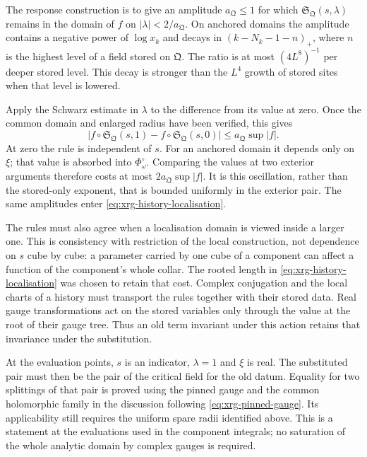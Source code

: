 \documentclass[11pt,letterpaper,reqno]{amsart}
\theoremstyle{definition}
\theoremstyle{remark}
\begin{document}
The response construction is to give an amplitude
$a_{\mathfrak Q}\le1$ for which
$\mathfrak S_{\mathfrak Q}(s,\lambda)$ remains in the domain of
$f$ on $|\lambda|<2/a_{\mathfrak Q}$. On anchored domains the
amplitude contains a negative power of $\log x_k$ and decays in
$(k-N_k-1-n)_+$, where $n$ is the highest level of a field stored
on $\mathfrak Q$. The ratio is at most $(4L^8)^{-1}$ per deeper
stored level. This decay is stronger than the $L^4$ growth of stored
sites when that level is lowered.

Apply the Schwarz estimate in $\lambda$ to the difference from
its value at zero. Once the common domain and enlarged radius
have been verified, this gives
\begin{equation}\label{eq:substituted-triple-oscillation}
 \big|f\circ\mathfrak S_{\mathfrak Q}(s,1)
             -f\circ\mathfrak S_{\mathfrak Q}(s,0)\big|
                  \le a_{\mathfrak Q}\sup|f|.
\end{equation}
At zero the rule is independent of $s$. For an anchored domain
it depends only on $\xi$; that value is absorbed into
$\Phi^\circ_\omega$. Comparing the values at two exterior
arguments therefore costs at most $2a_{\mathfrak Q}\sup|f|$.
It is this oscillation, rather than the stored-only exponent,
that is bounded uniformly in the exterior pair. The same
amplitudes enter \eqref{eq:xrg-history-localisation}.

The rules must also agree when a localisation domain is viewed
inside a larger one. This is consistency with restriction of
the local construction, not dependence on $s$ cube by cube:
a parameter carried by one cube of a component can affect a
function of the component's whole collar. The rooted length in
\eqref{eq:xrg-history-localisation} was chosen to retain that
cost. Complex conjugation and the local charts of a history
must transport the rules together with their stored data.
Real gauge transformations act on the stored variables only
through the value at the root of their gauge tree. Thus an old
term invariant under this action retains that invariance under
the substitution.

At the evaluation points, $s$ is an indicator, $\lambda=1$ and
$\xi$ is real. The substituted pair must then be the pair of
the critical field for the old datum. Equality for two splittings
of that pair is proved using the pinned gauge and the common
holomorphic family in the discussion following
\eqref{eq:xrg-pinned-gauge}. Its applicability still requires the
uniform spare radii identified above. This is a statement at the
evaluations used in the component integrals; no saturation of the
whole analytic domain by complex gauges is required.
\end{document}
